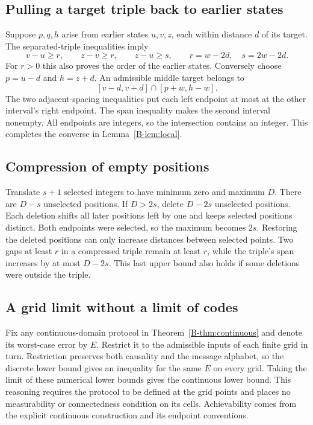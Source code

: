 \subsection{Pulling a target triple back to earlier states}
Suppose $p,q,h$ arise from earlier states $u,v,z$, each within distance $d$ of its target. The separated-triple inequalities imply
\[
 v-u\ge r,\qquad z-v\ge r,\qquad z-u\ge s,
 \qquad r=w-2d,\quad s=2w-2d.
\]
For $r>0$ this also proves the order of the earlier states. Conversely choose $p=u-d$ and $h=z+d$. An admissible middle target belongs to
\[
 [v-d,v+d]\cap[p+w,h-w].
\]
The two adjacent-spacing inequalities put each left endpoint at most at the other interval's right endpoint. The span inequality makes the second interval nonempty. All endpoints are integers, so the intersection contains an integer. This completes the converse in Lemma~\ref{B-lem:local}.

\subsection{Compression of empty positions}
Translate $s+1$ selected integers to have minimum zero and maximum $D$. There are $D-s$ unselected positions. If $D>2s$, delete $D-2s$ unselected positions. Each deletion shifts all later positions left by one and keeps selected positions distinct. Both endpoints were selected, so the maximum becomes $2s$. Restoring the deleted positions can only increase distances between selected points. Two gaps at least $r$ in a compressed triple remain at least $r$, while the triple's span increases by at most $D-2s$. This last upper bound also holds if some deletions were outside the triple.

\subsection{A grid limit without a limit of codes}
Fix any continuous-domain protocol in Theorem~\ref{B-thm:continuous} and denote its worst-case error by $E$. Restrict it to the admissible inputs of each finite grid in turn. Restriction preserves both causality and the message alphabet, so the discrete lower bound gives an inequality for the same $E$ on every grid. Taking the limit of these numerical lower bounds gives the continuous lower bound. This reasoning requires the protocol to be defined at the grid points and places no measurability or connectedness condition on its cells. Achievability comes from the explicit continuous construction and its endpoint conventions.

